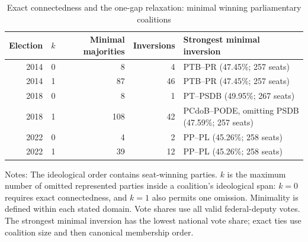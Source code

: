 \begin{table}[htbp]
\centering
\caption{Exact connectedness and the one-gap relaxation: minimal winning parliamentary coalitions}
\label{tab:one-gap-summary}
\small
\setlength{\tabcolsep}{4pt}
\begin{tabularx}{\textwidth}{@{}rcrr>{\raggedright\arraybackslash}X@{}}
\toprule
Election & \(k\) & Minimal majorities & Inversions & Strongest minimal inversion \\
\midrule
2014 & 0 & 8 & 4 & PTB--PR (47.45\%; 257 seats) \\
2014 & 1 & 87 & 46 & PTB--PR (47.45\%; 257 seats) \\
2018 & 0 & 8 & 1 & PT--PSDB (49.95\%; 267 seats) \\
2018 & 1 & 108 & 42 & PCdoB--PODE, omitting PSDB (47.59\%; 257 seats) \\
2022 & 0 & 4 & 2 & PP--PL (45.26\%; 258 seats) \\
2022 & 1 & 39 & 12 & PP--PL (45.26\%; 258 seats) \\
\bottomrule
\end{tabularx}
\begin{flushleft}
\footnotesize Notes: The ideological order contains seat-winning parties.
\(k\) is the maximum number of omitted represented parties inside a coalition's ideological span: \(k=0\) requires exact connectedness, and \(k=1\) also permits one omission.
Minimality is defined within each stated domain. Vote shares use all valid federal-deputy votes.
The strongest minimal inversion has the lowest national vote share; exact ties use coalition size and then canonical membership order.
\end{flushleft}
\end{table}
